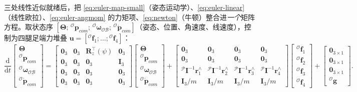 三处线性近似就绪后，把 \cref{eq:euler-map-small}（姿态运动学）、\cref{eq:euler-linear}（线性欧拉）、\cref{eq:euler-angmom} 的力矩项、\cref{eq:newton}（牛顿）整合进\emph{一个}矩阵方程。取状态序 $[\boldsymbol{\Theta};\,{}^{\mathcal{O}}\boldsymbol{p}_{com};\,{}^{\mathcal{O}}\boldsymbol{\omega}_{\mathcal{OB}};\,{}^{\mathcal{O}}\dot{\boldsymbol{p}}_{com}]$（姿态、位置、角速度、线速度），控制为四腿足端力堆叠 $\boldsymbol{u}=[{}^{\mathcal{O}}\boldsymbol{f}_1;\dots;{}^{\mathcal{O}}\boldsymbol{f}_4]$\cite{dicarlo2018cheetah,yu2021quadruped}：
\begin{equation}
\frac{\mathrm{d}}{\mathrm{d}t}\!\begin{bmatrix} \boldsymbol{\Theta} \\ {}^{\mathcal{O}}\boldsymbol{p}_{com} \\ {}^{\mathcal{O}}\boldsymbol{\omega}_{\mathcal{OB}} \\ {}^{\mathcal{O}}\dot{\boldsymbol{p}}_{com} \end{bmatrix}
=
\begin{bmatrix}
\mathbf{0}_{3} & \mathbf{0}_{3} & \mathbf{R}_z^\top(\psi) & \mathbf{0}_{3} \\
\mathbf{0}_{3} & \mathbf{0}_{3} & \mathbf{0}_{3} & \mathbf{I}_3 \\
\mathbf{0}_{3} & \mathbf{0}_{3} & \mathbf{0}_{3} & \mathbf{0}_{3} \\
\mathbf{0}_{3} & \mathbf{0}_{3} & \mathbf{0}_{3} & \mathbf{0}_{3}
\end{bmatrix}
\begin{bmatrix} \boldsymbol{\Theta} \\ {}^{\mathcal{O}}\boldsymbol{p}_{com} \\ {}^{\mathcal{O}}\boldsymbol{\omega}_{\mathcal{OB}} \\ {}^{\mathcal{O}}\dot{\boldsymbol{p}}_{com} \end{bmatrix}
+
\begin{bmatrix}
\mathbf{0}_{3} & \mathbf{0}_{3} & \mathbf{0}_{3} & \mathbf{0}_{3} \\
\mathbf{0}_{3} & \mathbf{0}_{3} & \mathbf{0}_{3} & \mathbf{0}_{3} \\
{}^{\mathcal{P}}\mathbf{I}^{-1}\boldsymbol{r}_1^{\wedge} & {}^{\mathcal{P}}\mathbf{I}^{-1}\boldsymbol{r}_2^{\wedge} & {}^{\mathcal{P}}\mathbf{I}^{-1}\boldsymbol{r}_3^{\wedge} & {}^{\mathcal{P}}\mathbf{I}^{-1}\boldsymbol{r}_4^{\wedge} \\
\mathbf{I}_3/m & \mathbf{I}_3/m & \mathbf{I}_3/m & \mathbf{I}_3/m
\end{bmatrix}
\begin{bmatrix} {}^{\mathcal{O}}\boldsymbol{f}_1 \\ {}^{\mathcal{O}}\boldsymbol{f}_2 \\ {}^{\mathcal{O}}\boldsymbol{f}_3 \\ {}^{\mathcal{O}}\boldsymbol{f}_4 \end{bmatrix}
+
\begin{bmatrix} \mathbf{0}_{3\times1} \\ \mathbf{0}_{3\times1} \\ \mathbf{0}_{3\times1} \\ {}^{\mathcal{O}}\boldsymbol{g} \end{bmatrix}.
\label{eq:cont-12state}
\end{equation}
